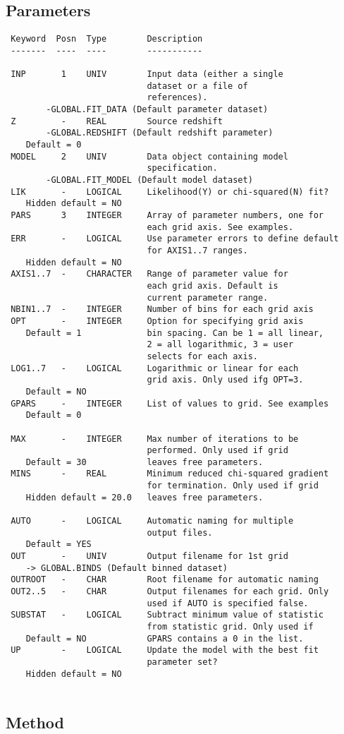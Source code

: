 \documentclass{book}
\renewcommand{\_}{{\tt\char'137}}     %
\begin{document}
\subsection{Parameters}
\begin{verbatim}
 Keyword  Posn  Type        Description
 -------  ----  ----        -----------
 
 INP       1    UNIV        Input data (either a single
                            dataset or a file of
                            references).
        -GLOBAL.FIT_DATA (Default parameter dataset)
 Z         -    REAL        Source redshift
        -GLOBAL.REDSHIFT (Default redshift parameter)
    Default = 0
 MODEL     2    UNIV        Data object containing model
                            specification.
        -GLOBAL.FIT_MODEL (Default model dataset)
 LIK       -    LOGICAL     Likelihood(Y) or chi-squared(N) fit?
    Hidden default = NO
 PARS      3    INTEGER     Array of parameter numbers, one for
                            each grid axis. See examples.
 ERR       -    LOGICAL     Use parameter errors to define default
                            for AXIS1..7 ranges.
    Hidden default = NO
 AXIS1..7  -    CHARACTER   Range of parameter value for
                            each grid axis. Default is
                            current parameter range.
 NBIN1..7  -    INTEGER     Number of bins for each grid axis
 OPT       -    INTEGER     Option for specifying grid axis
    Default = 1             bin spacing. Can be 1 = all linear,
                            2 = all logarithmic, 3 = user
                            selects for each axis.
 LOG1..7   -    LOGICAL     Logarithmic or linear for each
                            grid axis. Only used ifg OPT=3.
    Default = NO
 GPARS     -    INTEGER     List of values to grid. See examples
    Default = 0
 
 MAX       -    INTEGER     Max number of iterations to be
                            performed. Only used if grid
    Default = 30            leaves free parameters.
 MINS      -    REAL        Minimum reduced chi-squared gradient
                            for termination. Only used if grid
    Hidden default = 20.0   leaves free parameters.
 
 AUTO      -    LOGICAL     Automatic naming for multiple
                            output files.
    Default = YES
 OUT       -    UNIV        Output filename for 1st grid
    -> GLOBAL.BINDS (Default binned dataset)
 OUTROOT   -    CHAR        Root filename for automatic naming
 OUT2..5   -    CHAR        Output filenames for each grid. Only
                            used if AUTO is specified false.
 SUBSTAT   -    LOGICAL     Subtract minimum value of statistic
                            from statistic grid. Only used if
    Default = NO            GPARS contains a 0 in the list.
 UP        -    LOGICAL     Update the model with the best fit
                            parameter set?
    Hidden default = NO
 
\end{verbatim}\subsection{Method}
\end{document}
